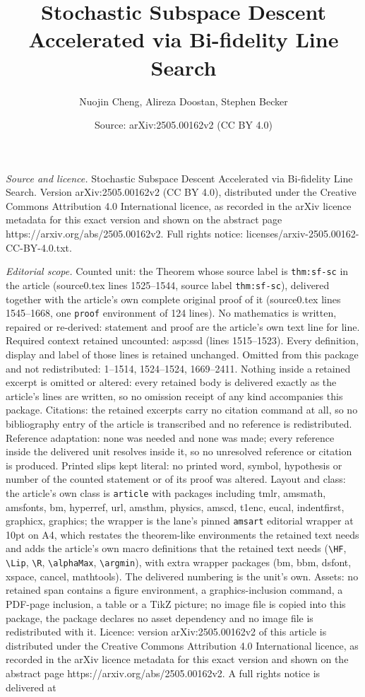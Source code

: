 \documentclass[10pt,a4paper]{amsart}
\title[Stochastic Subspace Descent Accelerated via Bi-fidelity Line]{Stochastic Subspace Descent Accelerated via Bi-fidelity Line Search}
\author{Nuojin Cheng, Alireza Doostan, Stephen Becker}
\date{Source: arXiv:2505.00162v2 (CC BY 4.0)}
\begin{document}
\maketitle

\noindent\emph{Source and licence.} Stochastic Subspace Descent Accelerated via Bi-fidelity Line Search. Version arXiv:2505.00162v2 (CC BY 4.0), distributed under the Creative Commons Attribution 4.0 International licence, as recorded in the arXiv licence metadata for this exact version and shown on the abstract page https://arxiv.org/abs/2505.00162v2. Full rights notice: licenses/arxiv-2505.00162-CC-BY-4.0.txt.\par\smallskip

\noindent\textit{Editorial scope.} Counted unit: the Theorem whose source label is \texttt{thm:sf-sc} in the article (source0.tex lines 1525--1544, source label \texttt{thm:sf-sc}), delivered together with the article's own complete original proof of it (source0.tex lines 1545--1668, one \texttt{proof} environment of 124 lines). No mathematics is written, repaired or re-derived: statement and proof are the article's own text line for line. Required context retained uncounted: asp:ssd (lines 1515--1523). Every definition, display and label of those lines is retained unchanged. Omitted from this package and not redistributed: 1--1514, 1524--1524, 1669--2411. Nothing inside a retained excerpt is omitted or altered: every retained body is delivered exactly as the article's lines are written, so no omission receipt of any kind accompanies this package. Citations: the retained excerpts carry no citation command at all, so no bibliography entry of the article is transcribed and no reference is redistributed. Reference adaptation: none was needed and none was made; every reference inside the delivered unit resolves inside it, so no unresolved reference or citation is produced. Printed slips kept literal: no printed word, symbol, hypothesis or number of the counted statement or of its proof was altered. Layout and class: the article's own class is \texttt{article} with packages including tmlr, amsmath, amsfonts, bm, hyperref, url, amsthm, physics, amscd, t1enc, eucal, indentfirst, graphicx, graphics; the wrapper is the lane's pinned \texttt{amsart} editorial wrapper at 10pt on A4, which restates the theorem-like environments the retained text needs and adds the article's own macro definitions that the retained text needs (\texttt{\textbackslash HF}, \texttt{\textbackslash Lip}, \texttt{\textbackslash R}, \texttt{\textbackslash alphaMax}, \texttt{\textbackslash argmin}), with extra wrapper packages (bm, bbm, dsfont, xspace, cancel, mathtools). The delivered numbering is the unit's own. Assets: no retained span contains a figure environment, a graphics-inclusion command, a PDF-page inclusion, a table or a TikZ picture; no image file is copied into this package, the package declares no asset dependency and no image file is redistributed with it. Licence: version arXiv:2505.00162v2 of this article is distributed under the Creative Commons Attribution 4.0 International licence, as recorded in the arXiv licence metadata for this exact version and shown on the abstract page https://arxiv.org/abs/2505.00162v2. A full rights notice is delivered at 
\end{document}
